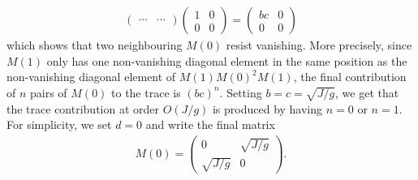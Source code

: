 \documentclass[10pt, a4paper]{article}
\begin{document}
{\begin{enumerate}
\begin{align*}
\begin{pmatrix}
      \cdots&\cdots
    \end{pmatrix}
    \begin{pmatrix}
      1&0\\
      0&0
    \end{pmatrix}
    =
    \begin{pmatrix}
      bc&0\\
      0&0
    \end{pmatrix}
  \end{align*}
  which shows that two neighbouring $M(0)$ resist vanishing. More precisely, since $M(1)$ only has one non-vanishing diagonal element in the same position as the non-vanishing diagonal element of  $M(1)M(0)^2M(1)$, the final contribution of $n$ pairs of $M(0)$ to the trace is $(bc)^n$. Setting $b = c = \sqrt{J/g}$, we get that the trace contribution at order $O(J/g)$ is produced by having $n=0$ or $n=1$. For simplicity, we set $d=0$ and write the final matrix  
  \begin{align*}
    M(0) = \begin{pmatrix}
      0&\sqrt{J/g}\\
      \sqrt{J/g}&0
    \end{pmatrix}.
  \end{align*}
  

\end{enumerate}}
\end{document}
